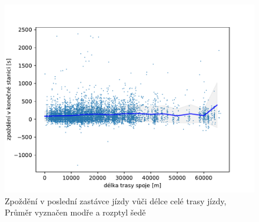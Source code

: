 \begin{figure}
   \centering
 \includegraphics[width=1\linewidth]{../img/trips_total_delay}
 \caption{Zpoždění v poslední zastávce jízdy vůči délce celé trasy jízdy, Průměr vyznačen modře a rozptyl šedě}
 \label{fig:trips_total_delay}
\end{figure}

